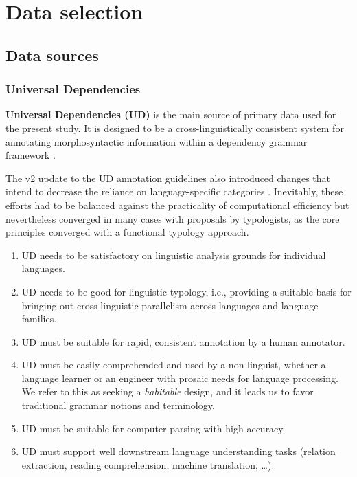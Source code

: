 \chapter{Data selection}

\section{Data sources}\label{sec:data}

\subsection{Universal Dependencies}\label{subsec:data_ud}


\textbf{Universal Dependencies (UD)} is the main source of primary data used for the present study. It is designed to be a cross-linguistically consistent system for annotating morphosyntactic information within a dependency grammar framework \citep{demarneffe2021}. 

The v2 update to the UD annotation guidelines also introduced changes that intend to decrease the reliance on language-specific categories \citep{nivre2020}. Inevitably, these efforts had to be balanced against the practicality of computational efficiency but nevertheless converged in many cases with proposals by typologists, as the core principles converged with a functional typology approach. \citet{croft2017}

\begin{enumerate}
    \item UD needs to be satisfactory on linguistic analysis grounds for individual languages.
    \item UD needs to be good for linguistic typology, i.e., providing a suitable basis for bringing out cross-linguistic parallelism across languages and language families.
    \item UD must be suitable for rapid, consistent annotation by a human annotator.
    \item UD must be easily comprehended and used by a non-linguist, whether a language learner or an engineer with prosaic needs for language processing. We refer to this as seeking a \textit{habitable} design, and it leads us to favor traditional grammar notions and terminology.
    \item UD must be suitable for computer parsing with high accuracy.
    \item UD must support well downstream language understanding tasks (relation extraction, reading comprehension, machine translation, \dots).
\end{enumerate}

